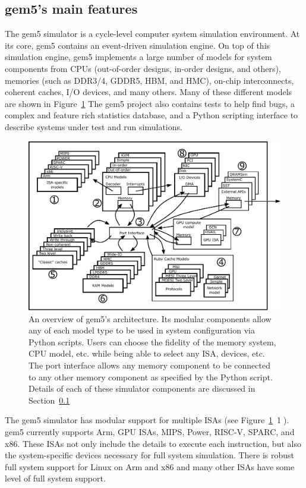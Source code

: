 \subsection{gem5's main features}
\label{sec:main-features}

The gem5 simulator is a cycle-level computer system simulation environment.
At its core, gem5 contains an event-driven simulation engine.
On top of this simulation engine, gem5 implements a large number of models for system components from CPUs (out-of-order designs, in-order designs, and others), memories (such as DDR3/4, GDDR5, HBM, and HMC), on-chip interconnects, coherent caches, I/O devices, and many others.
Many of these different models are shown in Figure~\ref{fig:gem5-big-picture}
The gem5 project also contains tests to help find bugs, a complex and feature rich statistics database, and a Python scripting interface to describe systems under test and run simulations.

\begin{figure}
  \centering
  \includegraphics[width=\textwidth]{fig/gem5-big-picture}
  \caption{An overview of gem5's architecture. Its modular components allow any of each model type to be used in system configuration via Python scripts. Users can choose the fidelity of the memory system, CPU model, etc. while being able to select any ISA, devices, etc. The port interface allows any memory component to be connected to any other memory component as specified by the Python script. Details of each of these simulator components are discussed in Section~\ref{sec:main-features}}
  \label{fig:gem5-big-picture}
\end{figure}

The gem5 simulator has modular support for multiple ISAs (see Figure~\ref{fig:gem5-big-picture}~\textcircled{1}).
gem5 currently supports Arm, GPU ISAs, MIPS, Power, RISC-V, SPARC, and x86.
These ISAs not only include the details to execute each instruction, but also the system-specific devices necessary for full system simulation.
There is robust full system support for Linux on Arm and x86 and many other ISAs have some level of full system support.

